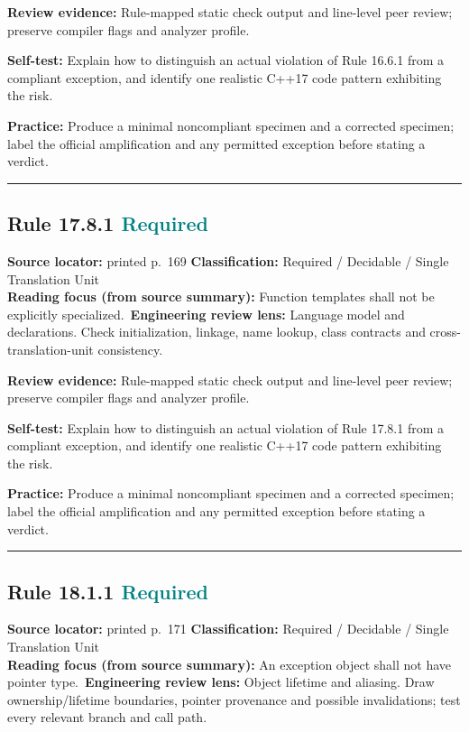 \documentclass[10pt,letterpaper]{article}
\begin{document}
\textbf{Review evidence:} Rule-mapped static check output and line-level peer review; preserve compiler flags and analyzer profile.

\textbf{Self-test:} Explain how to distinguish an actual violation of Rule 16.6.1 from a compliant exception, and identify one realistic C++17 code pattern exhibiting the risk.\par
\textbf{Practice:} Produce a minimal noncompliant specimen and a corrected specimen; label the official amplification and any permitted exception before stating a verdict.
\smallskip\hrule\smallskip
\subsection*{Rule 17.8.1 \enspace \texorpdfstring{\small\textcolor{teal}{Required}}{Required}}
\noindent\textbf{Source locator:} printed p.~169 \quad\textbf{Classification:} Required / Decidable / Single Translation Unit\\
\textbf{Reading focus (from source summary):} Function templates shall not be explicitly specialized.\
\textbf{Engineering review lens:} Language model and declarations. Check initialization, linkage, name lookup, class contracts and cross-translation-unit consistency.

\textbf{Review evidence:} Rule-mapped static check output and line-level peer review; preserve compiler flags and analyzer profile.

\textbf{Self-test:} Explain how to distinguish an actual violation of Rule 17.8.1 from a compliant exception, and identify one realistic C++17 code pattern exhibiting the risk.\par
\textbf{Practice:} Produce a minimal noncompliant specimen and a corrected specimen; label the official amplification and any permitted exception before stating a verdict.
\smallskip\hrule\smallskip
\subsection*{Rule 18.1.1 \enspace \texorpdfstring{\small\textcolor{teal}{Required}}{Required}}
\noindent\textbf{Source locator:} printed p.~171 \quad\textbf{Classification:} Required / Decidable / Single Translation Unit\\
\textbf{Reading focus (from source summary):} An exception object shall not have pointer type.\
\textbf{Engineering review lens:} Object lifetime and aliasing. Draw ownership/lifetime boundaries, pointer provenance and possible invalidations; test every relevant branch and call path.
\end{document}
